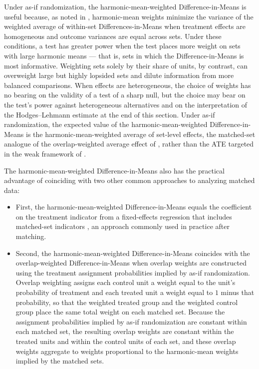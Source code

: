 \documentclass[
  12pt,
  leqno]{article}
\begin{document}
Under as-if randomization, the harmonic-mean-weighted
Difference-in-Means is useful because, as noted in
,
harmonic-mean weights minimize the variance of the weighted average of
within-set Differences-in-Means when treatment effects are homogeneous
and outcome variances are equal across sets. Under these conditions, a
test has greater power when the test places more weight on sets with
large harmonic means --- that is, sets in which the Difference-in-Means
is most informative. Weighting sets solely by their share of units, by
contrast, can overweight large but highly lopsided sets and dilute
information from more balanced comparisons. When effects are
heterogeneous, the choice of weights has no bearing on the validity of a
test of a sharp null, but the choice may bear on the test's power
against heterogeneous alternatives and on the interpretation of the
Hodges--Lehmann estimate at the end of this section. Under as-if
randomization, the expected value of the harmonic-mean-weighted
Difference-in-Means is the harmonic-mean-weighted average of set-level
effects, the matched-set analogue of the overlap-weighted average effect
of \citet{lietal2018}, rather than the ATE targeted in the weak
framework of .

The harmonic-mean-weighted Difference-in-Means also has the practical
advantage of coinciding with two other common approaches to analyzing
matched data:

\begin{itemize}
\item
  First, the harmonic-mean-weighted Difference-in-Means equals the
  coefficient on the treatment indicator from a fixed-effects regression
  that includes matched-set indicators \citep[p.~229]{hansenbowers2008},
  an approach commonly used in practice after matching.
\item
  Second, the harmonic-mean-weighted Difference-in-Means coincides with
  the overlap-weighted Difference-in-Means \citep{lietal2018} when
  overlap weights are constructed using the treatment assignment
  probabilities implied by as-if randomization. Overlap weighting
  assigns each control unit a weight equal to the unit's probability of
  treatment and each treated unit a weight equal to \(1\) minus that
  probability, so that the weighted treated group and the weighted
  control group place the same total weight on each matched set. Because
  the assignment probabilities implied by as-if randomization are
  constant within each matched set, the resulting overlap weights are
  constant within the treated units and within the control units of each
  set, and these overlap weights aggregate to weights proportional to
  the harmonic-mean weights implied by the matched sets.
\end{itemize}
\end{document}
